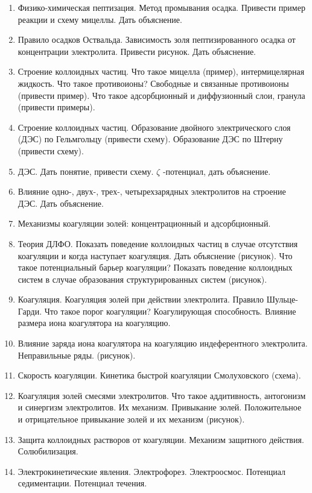 \begin{enumerate}
\item
Физико-химическая пептизация. Метод промывания осадка. Привести пример реакции и схему мицеллы. Дать объяснение.
 
\item
Правило осадков Оствальда. Зависимость золя пептизированного осадка от концентрации электролита. Привести рисунок. Дать объяснение.

\item
Строение коллоидных частиц. Что такое мицелла (пример), интермицелярная жидкость. Что такое противоионы? Свободные и связанные противоионы (привести пример). Что такое адсорбционный и диффузионный слои, гранула (привести примеры). 
 
\item
Строение коллоидных частиц. Образование двойного электрического слоя (ДЭС) по Гельмгольцу (привести схему). Образование ДЭС по Штерну (привести схему).
 
\item
ДЭС. Дать понятие, привести схему. $\zeta$ -потенциал, дать объяснение. 
 
\item
Влияние одно-, двух-, трех-, четырехзарядных электролитов на строение ДЭС. Дать объяснение.
 
\item
Механизмы коагуляции золей: концентрационный и адсорбционный.
 
\item
Теория ДЛФО. Показать поведение коллоидных частиц в случае отсутствия коагуляции и когда наступает коагуляция. Дать объяснение (рисунок). Что такое потенциальный барьер коагуляции? Показать поведение коллоидных систем в случае образования структурированных систем (рисунок).
 
\item
Коагуляция. Коагуляция золей при действии электролита. Правило Шульце-Гарди. Что такое порог коагуляции? Коагулирующая способность. Влияние размера иона коагулятора на коагуляцию. 
 
\item
Влияние заряда иона коагулятора на коагуляцию индеферентного электролита. Неправильные ряды. (рисунок).
 
\item
Скорость коагуляции. Кинетика быстрой коагуляции Смолуховского (схема).
 
\item
Коагуляция золей смесями электролитов. Что такое аддитивность, антогонизм и синергизм электролитов. Их механизм. Привыкание золей. Положительное и отрицательное привыкание золей и их механизм (рисунок). 
 
\item
Защита коллоидных растворов от коагуляции. Механизм защитного действия. Солюбилизация.
 
\item
Электрокинетические явления. Электрофорез. Электроосмос. Потенциал седиментации. Потенциал течения.
\end{enumerate}
